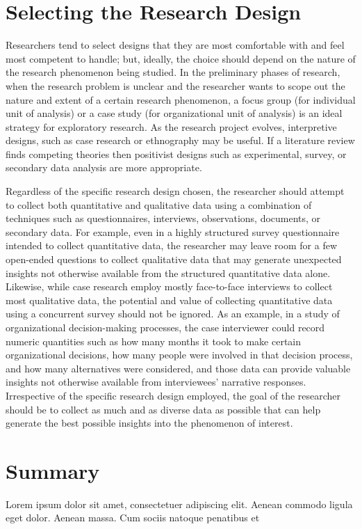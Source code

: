 \section{Selecting the Research Design}

Researchers tend to select designs that they are most comfortable with and feel most competent to handle; but, ideally, the choice should depend on the nature of the research phenomenon being studied. In the preliminary phases of research, when the research problem is unclear and the researcher wants to scope out the nature and extent of a certain research phenomenon, a focus group (for individual unit of analysis) or a case study (for organizational unit of analysis) is an ideal strategy for exploratory research. As the research project evolves, interpretive designs, such as case research or ethnography may be useful. If a literature review finds competing theories then positivist designs such as experimental, survey, or secondary data analysis are more appropriate.

Regardless of the specific research design chosen, the researcher should attempt to collect both quantitative and qualitative data using a combination of techniques such as questionnaires, interviews, observations, documents, or secondary data. For example, even in a highly structured survey questionnaire intended to collect quantitative data, the researcher may leave room for a few open-ended questions to collect qualitative data that may generate unexpected insights not otherwise available from the structured quantitative data alone. Likewise, while case research employ mostly face-to-face interviews to collect most qualitative data, the potential and value of collecting quantitative data using a concurrent survey should not be ignored. As an example, in a study of organizational decision-making processes, the case interviewer could record numeric quantities such as how many months it took to make certain organizational decisions, how many people were involved in that decision process, and how many alternatives were considered, and those data can provide valuable insights not otherwise available from interviewees' narrative responses. Irrespective of the specific research design employed, the goal of the researcher should be to collect as much and as diverse data as possible that can help generate the best possible insights into the phenomenon of interest.

\section{Summary}\label{ch05:summary}

Lorem ipsum dolor sit amet, consectetuer adipiscing elit. Aenean commodo ligula eget dolor. Aenean massa. Cum sociis natoque penatibus et
